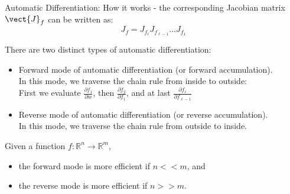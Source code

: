 \begin{frame}[t,allowframebreaks]{Automatic Differentiation: How it works -}
  the corresponding 
  \gls{Jacobian matrix} $\vect{J}_{f}$ 
  can be written as:
  \begin{equation}
    J_{f} = J_{f_{\ell}} J_{f_{\ell-1}} ... J_{f_1}
    \label{eq:ad_jacobian_composite_function_2}
  \end{equation}
  
  \framebreak
  
  There are two distinct types of automatic differentiation:
  
  \begin{itemize}
    \item 
      Forward mode of automatic differentiation 
      (or forward accumulation).\\
      In this mode, we traverse the chain rule from inside to outside:\\
      First we evaluate $\displaystyle \frac{\partial f_1}{\partial w}$,
      then $\displaystyle \frac{\partial f_2}{\partial f_1}$,
      and at last $\displaystyle \frac{\partial f_\ell}{\partial f_{\ell-1}}$
    \item 
      Reverse mode of automatic differentiation 
      (or reverse accumulation).\\
      In this mode, we traverse the chain rule from outside to inside.
  \end{itemize}
  
  \vspace{0.2cm}
  
  Given a function $f: \mathbb{R}^n \rightarrow \mathbb{R}^m$,
  \begin{itemize}
    \item 
      the forward mode is more efficient if $n << m$, and
    \item 
      the reverse mode is more efficient if $n >> m$.
  \end{itemize}
  
\end{frame}
  
  